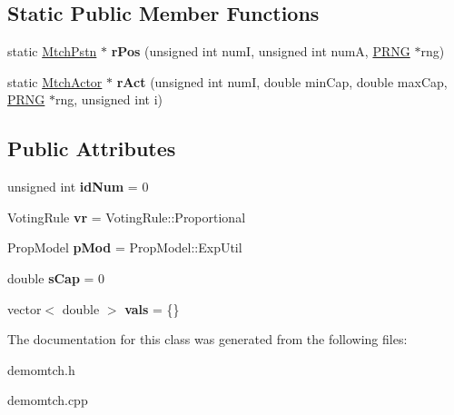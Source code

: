 \subsection*{Static Public Member Functions}
\begin{DoxyCompactItemize}
\item 
\hypertarget{class_demo_mtch_1_1_mtch_actor_afdccb60bbf9b804a6ffe6ab07d666752}{static \hyperlink{class_k_base_1_1_mtch_pstn}{Mtch\-Pstn} $\ast$ {\bfseries r\-Pos} (unsigned int num\-I, unsigned int num\-A, \hyperlink{class_k_base_1_1_p_r_n_g}{P\-R\-N\-G} $\ast$rng)}\label{class_demo_mtch_1_1_mtch_actor_afdccb60bbf9b804a6ffe6ab07d666752}

\item 
\hypertarget{class_demo_mtch_1_1_mtch_actor_af613e5a133e782ae62cf3b5b26c1fc45}{static \hyperlink{class_demo_mtch_1_1_mtch_actor}{Mtch\-Actor} $\ast$ {\bfseries r\-Act} (unsigned int num\-I, double min\-Cap, double max\-Cap, \hyperlink{class_k_base_1_1_p_r_n_g}{P\-R\-N\-G} $\ast$rng, unsigned int i)}\label{class_demo_mtch_1_1_mtch_actor_af613e5a133e782ae62cf3b5b26c1fc45}

\end{DoxyCompactItemize}
\subsection*{Public Attributes}
\begin{DoxyCompactItemize}
\item 
\hypertarget{class_demo_mtch_1_1_mtch_actor_a6620ce7762057a59fc3a1a98218a6fcf}{unsigned int {\bfseries id\-Num} = 0}\label{class_demo_mtch_1_1_mtch_actor_a6620ce7762057a59fc3a1a98218a6fcf}

\item 
\hypertarget{class_demo_mtch_1_1_mtch_actor_a98229798fc76627c2bf2a630a9ae45d7}{Voting\-Rule {\bfseries vr} = Voting\-Rule\-::\-Proportional}\label{class_demo_mtch_1_1_mtch_actor_a98229798fc76627c2bf2a630a9ae45d7}

\item 
\hypertarget{class_demo_mtch_1_1_mtch_actor_a1adca2569c4a1ecfa133addad09937e7}{Prop\-Model {\bfseries p\-Mod} = Prop\-Model\-::\-Exp\-Util}\label{class_demo_mtch_1_1_mtch_actor_a1adca2569c4a1ecfa133addad09937e7}

\item 
\hypertarget{class_demo_mtch_1_1_mtch_actor_aa61012a0056831027648d2a0e03f04f9}{double {\bfseries s\-Cap} = 0}\label{class_demo_mtch_1_1_mtch_actor_aa61012a0056831027648d2a0e03f04f9}

\item 
\hypertarget{class_demo_mtch_1_1_mtch_actor_a8949d6d327fc75b24f53e010bc24537d}{vector$<$ double $>$ {\bfseries vals} = \{\}}\label{class_demo_mtch_1_1_mtch_actor_a8949d6d327fc75b24f53e010bc24537d}

\end{DoxyCompactItemize}


The documentation for this class was generated from the following files\-:\begin{DoxyCompactItemize}
\item 
demomtch.\-h\item 
demomtch.\-cpp\end{DoxyCompactItemize}
